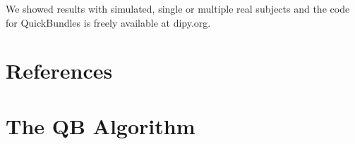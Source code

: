 \documentclass[preprint,authoryear,a4paper,10pt,onecolumn]{elsarticle}
\begin{document}
We showed results with simulated, single or multiple real subjects
and the code for QuickBundles is freely available at dipy.org.

\section{References}

%



\appendix
\section{The QB Algorithm}
\label{QB-algorithm}

\end{document}
